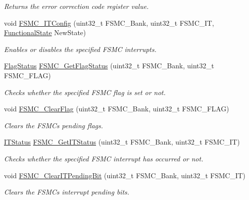 \begin{DoxyCompactItemize}
\begin{DoxyCompactList}\small\item\em Returns the error correction code register value. \end{DoxyCompactList}\item 
void \mbox{\hyperlink{group___f_s_m_c___private___functions_ga217027ae3cd213b9076b6a1be197064c}{F\+S\+M\+C\+\_\+\+I\+T\+Config}} (uint32\+\_\+t F\+S\+M\+C\+\_\+\+Bank, uint32\+\_\+t F\+S\+M\+C\+\_\+\+IT, \mbox{\hyperlink{group___exported__types_gac9a7e9a35d2513ec15c3b537aaa4fba1}{Functional\+State}} New\+State)
\begin{DoxyCompactList}\small\item\em Enables or disables the specified F\+S\+MC interrupts. \end{DoxyCompactList}\item 
\mbox{\hyperlink{group___exported__types_ga89136caac2e14c55151f527ac02daaff}{Flag\+Status}} \mbox{\hyperlink{group___f_s_m_c___private___functions_gae00355115b078f483f0771057bb849c4}{F\+S\+M\+C\+\_\+\+Get\+Flag\+Status}} (uint32\+\_\+t F\+S\+M\+C\+\_\+\+Bank, uint32\+\_\+t F\+S\+M\+C\+\_\+\+F\+L\+AG)
\begin{DoxyCompactList}\small\item\em Checks whether the specified F\+S\+MC flag is set or not. \end{DoxyCompactList}\item 
void \mbox{\hyperlink{group___f_s_m_c___private___functions_ga697618f2de0ad9a8a82461ddbebd5264}{F\+S\+M\+C\+\_\+\+Clear\+Flag}} (uint32\+\_\+t F\+S\+M\+C\+\_\+\+Bank, uint32\+\_\+t F\+S\+M\+C\+\_\+\+F\+L\+AG)
\begin{DoxyCompactList}\small\item\em Clears the F\+S\+MC\textquotesingle{}s pending flags. \end{DoxyCompactList}\item 
\mbox{\hyperlink{group___exported__types_gaacbd7ed539db0aacd973a0f6eca34074}{I\+T\+Status}} \mbox{\hyperlink{group___f_s_m_c___private___functions_ga7fce9ca889d33cd8b8b7413875dd4d73}{F\+S\+M\+C\+\_\+\+Get\+I\+T\+Status}} (uint32\+\_\+t F\+S\+M\+C\+\_\+\+Bank, uint32\+\_\+t F\+S\+M\+C\+\_\+\+IT)
\begin{DoxyCompactList}\small\item\em Checks whether the specified F\+S\+MC interrupt has occurred or not. \end{DoxyCompactList}\item 
void \mbox{\hyperlink{group___f_s_m_c___private___functions_gad9387e7674b8a376256a3378649e004e}{F\+S\+M\+C\+\_\+\+Clear\+I\+T\+Pending\+Bit}} (uint32\+\_\+t F\+S\+M\+C\+\_\+\+Bank, uint32\+\_\+t F\+S\+M\+C\+\_\+\+IT)
\begin{DoxyCompactList}\small\item\em Clears the F\+S\+MC\textquotesingle{}s interrupt pending bits. \end{DoxyCompactList}\end{DoxyCompactItemize}


